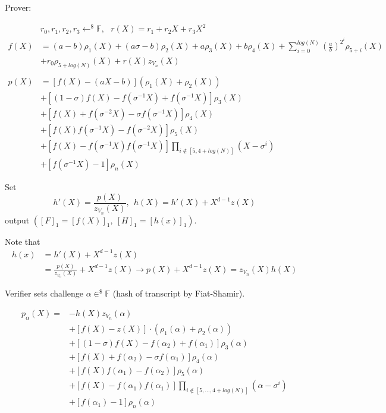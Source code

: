 \documentclass{article}
\theoremstyle{definition}
\begin{document}
Prover:
\begin{small}
\begin{align*}
	&r_0, r_1, r_2, r_3 \leftarrow^\$ \mathbb{F},~~~ r(X)=r_1+r_2 X + r_3 X^2\\
	f(X) &= (a-b) \rho_1(X) + (a \sigma - b) \rho_2(X) + a \rho_3(X) + b \rho_4(X) + \sum_{i=0}^{log(N)} (\frac{a}{b})^{2^i} \rho_{5+i}(X)\\
	     &+ r_0 \rho_{5+log(N)}(X) + r(X) z_{V_n}(X)\\
	\\
p(X) &= [f(X) - (aX-b)](\rho_1(X) + \rho_2(X))\\
     &+[(1-\sigma)f(X) - f(\sigma^{-1}X) + f(\sigma^{-1}X)] \rho_3(X)\\
     &+ [f(X) + f(\sigma^{-2}X) - \sigma f(\sigma^{-1} X)] \rho_4(X)\\
     &+ [f(X)f(\sigma^{-1}X)-f(\sigma^{-2}X)] \rho_5(X)\\
     &+ [f(X)-f(\sigma^{-1}X)f(\sigma^{-1}X)] \prod_{i \notin [5, 4+log(N)]} (X-\sigma^i)\\
     &+ [f(\sigma^{-1}X)-1] \rho_n(X)
\end{align*}
\end{small}

Set
$$h'(X) = \frac{p(X)}{z_{V_n}(X)},~~h(X)=h'(X) + X^{d-1} z(X)$$
output $([F]_1=[f(X)]_1, ~ [H]_1=[h(x)]_1)$.

\begin{footnotesize}
	Note that
	\begin{align*}
		h(x)&=h'(X)+X^{d-1}z(X)\\
		     &=\frac{p(X)}{z_{V_n}(X)} + X^{d-1} z(X) \longrightarrow p(X)+X^{d-1} z(X) = z_{V_n}(X) h(X)
	\end{align*}
\end{footnotesize}

Verifier sets challenge $\alpha \in^{\$} \mathbb{F}$ (hash of transcript by Fiat-Shamir).

\begin{align*}
	p_{\alpha}(X) = &-h(X) z_{V_n}(\alpha)\\
			&+ [f(X)-z(X)]\cdot (\rho_1(\alpha) + \rho_2(\alpha))\\
			&+ [(1-\sigma) f(X) - f(\alpha_2) + f(\alpha_1)] \rho_3(\alpha)\\
			&+ [f(X) + f(\alpha_2) - \sigma f(\alpha_1)] \rho_4(\alpha)\\
			&+ [f(X) f(\alpha_1) - f(\alpha_2)] \rho_5(\alpha)\\
			&+ [f(X) - f(\alpha_1) f(\alpha_1)] \prod_{i \notin [5, \ldots, 4+log(N)]} (\alpha - \sigma^i)\\
			&+ [f(\alpha_1)-1] \rho_n(\alpha)
\end{align*}
\end{document}
